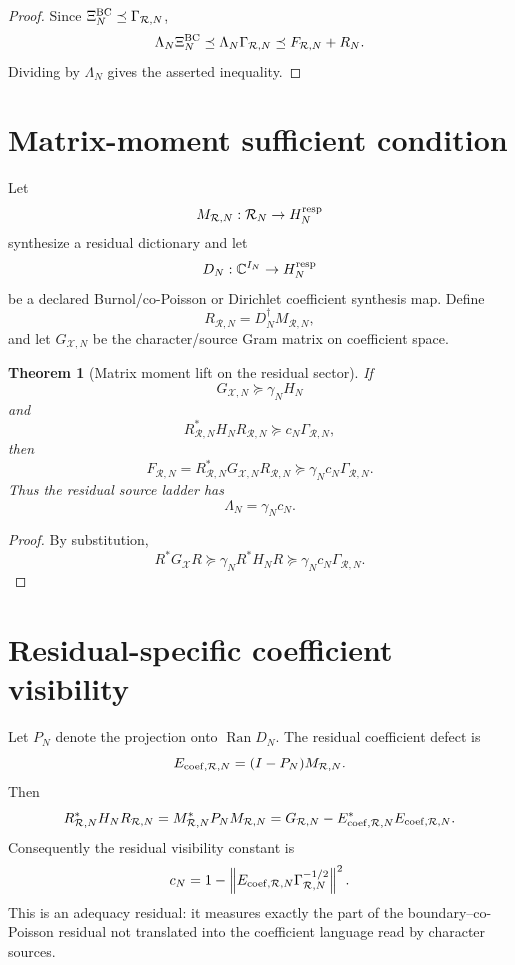 \documentclass[11pt]{article}
\newtheorem{theorem}{Theorem}
\begin{document}
\begin{proof}
Since $\Xi_N^{\rm BC}\preceq\Gamma_{\mathcal R,N}$,
\[
  \Lambda_N\Xi_N^{\rm BC}\preceq \Lambda_N\Gamma_{\mathcal R,N}\preceq F_{\mathcal R,N}+R_N.
\]
Dividing by $\Lambda_N$ gives the asserted inequality.
\end{proof}

\section{Matrix-moment sufficient condition}
Let
\[
  M_{\mathcal R,N}:\mathcal R_N\to H_N^{\rm resp}
\]
synthesize a residual dictionary and let
\[
  D_N:\mathbb C^{I_N}\to H_N^{\rm resp}
\]
be a declared Burnol/co-Poisson or Dirichlet coefficient synthesis map.  Define
\[
  R_{\mathcal R,N}=D_N^\dagger M_{\mathcal R,N},
\]
and let $G_{\mathcal X,N}$ be the character/source Gram matrix on coefficient space.

\begin{theorem}[Matrix moment lift on the residual sector]
If
\[
  G_{\mathcal X,N}\succeq \gamma_N H_N
\]
and
\[
  R_{\mathcal R,N}^*H_NR_{\mathcal R,N}\succeq c_N\Gamma_{\mathcal R,N},
\]
then
\[
  F_{\mathcal R,N}=R_{\mathcal R,N}^*G_{\mathcal X,N}R_{\mathcal R,N}
  \succeq \gamma_Nc_N\Gamma_{\mathcal R,N}.
\]
Thus the residual source ladder has
\[
  \Lambda_N=\gamma_Nc_N.
\]
\end{theorem}

\begin{proof}
By substitution,
\[
  R^*G_{\mathcal X}R\succeq\gamma_NR^*H_NR\succeq\gamma_Nc_N\Gamma_{\mathcal R,N}.
\]
\end{proof}

\section{Residual-specific coefficient visibility}
Let $P_N$ denote the projection onto $\operatorname{Ran}D_N$.  The residual coefficient defect is
\[
  E_{{\rm coef},\mathcal R,N}=(I-P_N)M_{\mathcal R,N}.
\]
Then
\[
  R_{\mathcal R,N}^*H_NR_{\mathcal R,N}
  =M_{\mathcal R,N}^*P_NM_{\mathcal R,N}
  =G_{\mathcal R,N}-E_{{\rm coef},\mathcal R,N}^*E_{{\rm coef},\mathcal R,N}.
\]
Consequently the residual visibility constant is
\[
  c_N=1-
  \left\|E_{{\rm coef},\mathcal R,N}\Gamma_{\mathcal R,N}^{-1/2}\right\|^2.
\]
This is an adequacy residual: it measures exactly the part of the boundary--co-Poisson residual not translated into the coefficient language read by character sources.
\end{document}
